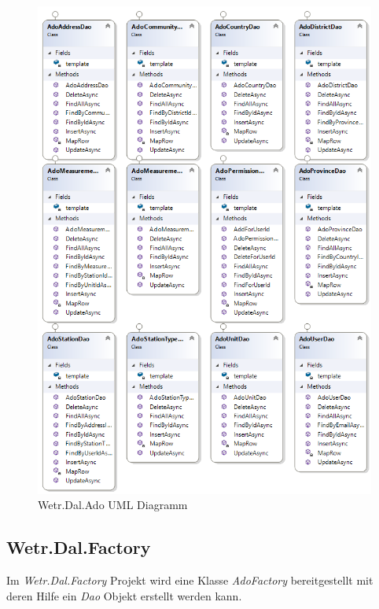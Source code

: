 \begin{figure}[H]
\centering
\includegraphics[width=.8\textwidth]{pictures/Wetr_Dal_Ado.png}
\caption{Wetr.Dal.Ado UML Diagramm}
\label{fig:Wetr.Dal.Ado}
\end{figure}
\raggedright

\subsection{Wetr.Dal.Factory}
Im \textit{Wetr.Dal.Factory} Projekt wird eine Klasse \textit{AdoFactory} bereitgestellt mit deren Hilfe ein \textit{Dao} Objekt erstellt werden kann.


